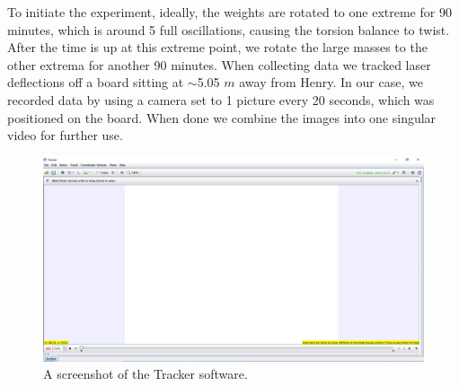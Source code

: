 \documentclass[a4paper,12pt,english]{all-in-one} %
\begin{document}
{To initiate the experiment, ideally, the weights are rotated to one extreme for 90 minutes, which is around 5 full oscillations, causing the torsion balance to twist. After the time is up at this extreme point, we rotate the large masses to the other extrema for another 90 minutes. When collecting data we tracked laser deflections off a board sitting at $\sim$5.05 $m$ away from Henry. In our case, we recorded data by using a camera set to 1 picture every 20 seconds, which was positioned on the board. When done we combine the images into one singular video for further use.


}

\begin{figure}[h]
    \centering
    \includegraphics[width=1.0\linewidth]{7-cavendish/overleaf/droc/images/Capture.PNG}
    \caption{ A screenshot of the Tracker software.}
    \label{fig: cavendish tracker}
\end{figure}
\end{document}
